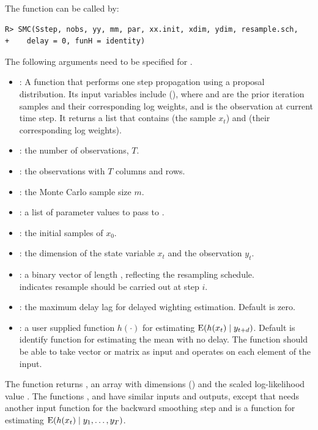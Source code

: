 The  function can be called by:
\begin{verbatim}
R> SMC(Sstep, nobs, yy, mm, par, xx.init, xdim, ydim, resample.sch,
+    delay = 0, funH = identity)
\end{verbatim}
The following arguments need to be specified for .
\begin{itemize}\setlength\itemsep{-0.3em}
\item {}: A function that performs one step propagation using a proposal distribution. Its input variables include (), where   and  are the prior iteration samples and their corresponding log weights, and  is the observation at current time step. It returns a list that contains  (the sample $x_t$) and  (their corresponding log weights).
\item {}: the number of observations, $T$.
\item {}: the observations with $T$ columns and  rows.
\item {}: the Monte Carlo sample size $m$.
\item {}: a list of parameter values to pass to .
\item {}: the initial samples of $x_0$.
\item {}: the dimension of the state variable $x_t$ and the observation $y_t$.
\item {}: a binary vector of length , reflecting the resampling schedule. \\
 indicates resample should be carried out at step $i$.
\item {}: the maximum delay lag for delayed wighting estimation. Default is zero.
\item {}: a user supplied function $h(\cdot)$ for estimating ${\rm E}(h(x_t)\mid y_{t+d})$. Default is identify function for estimating the mean with no delay. The function should be able to take vector or matrix as input and operates on each element of the input.
\end{itemize}
The function returns , an array with dimensions () and the scaled log-likelihood value . The functions ,  and  have similar inputs and outputs, except that  needs another input function for the backward smoothing step and  is a function for estimating ${\rm E}(h(x_t)\mid y_1,\ldots, y_{T})$.

